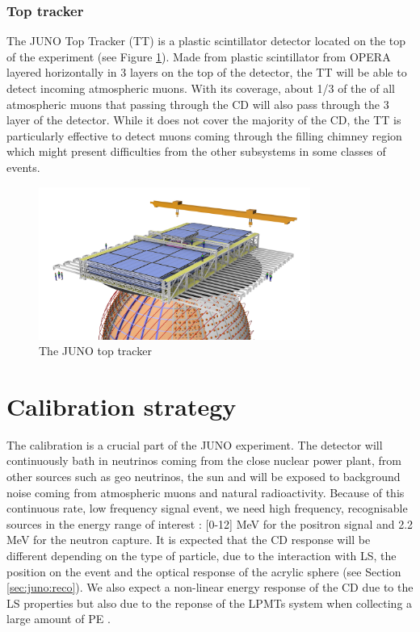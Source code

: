 \documentclass[../main.tex]{subfiles}
\begin{document}
\subsubsection{Top tracker}
The JUNO Top Tracker (TT) is a plastic scintillator detector located on the top of the experiment (see Figure \ref{fig:juno:tt}). Made from plastic scintillator from OPERA \cite{acquafredda_opera_2009} layered horizontally in 3 layers on the top of the detector, the TT will be able to detect incoming atmospheric muons.
With its coverage, about 1/3 of the of all atmospheric muons that passing through the CD will also pass through the 3 layer of the detector. While it does not cover the majority of the CD, the TT is particularly effective to detect muons coming through the filling chimney region which might present difficulties from the other subsystems in some classes of events.
\begin{figure}[ht]
  \centering
  \includegraphics[height=5cm]{images/juno/Global_TT_01.png}
  \caption{The JUNO top tracker}
  \label{fig:juno:tt}
\end{figure}

\section{Calibration strategy}
\label{sec:juno:calib}

The calibration is a crucial part of the JUNO experiment. The detector will continuously bath in neutrinos coming from the close nuclear power plant, from other sources such as geo neutrinos, the sun and will be exposed to background noise coming from atmospheric muons and natural radioactivity.
Because of this continuous rate, low frequency signal event, we need high frequency, recognisable sources in the energy range of interest : [0-12] MeV for the positron signal and 2.2 MeV for the neutron capture.
It is expected that the CD response will be different depending on the type of particle, due to the interaction with LS, the position on the event and the optical response of the acrylic sphere (see Section \ref{sec:juno:reco}).
We also expect a non-linear energy response of the CD due to the LS properties \cite{bay_optimization_2020} but also due to the reponse of the LPMTs system when collecting a large amount of PE \cite{han_dual_2021}.
\end{document}
